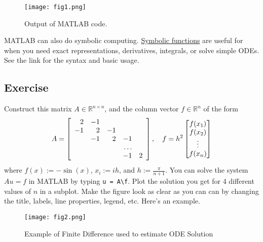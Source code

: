 \documentclass{article}
\begin{document}
\begin{figure}
\centering
\texttt{[image: fig1.png]}
\caption{Output of MATLAB code.}
\end{figure}

MATLAB can also do symbolic computing. \href{https://www.mathworks.com/help/symbolic/create-symbolic-functions.html}{Symbolic functions} are useful for when you need exact representations, derivatives, integrals, or solve simple ODEs. See the link for the syntax and basic usage.

\subsection{Exercise}
Construct this matrix $A\in \mathbb{R}^{n\times n}$, and the column vector $f\in \mathbb{R}^n$ of the form
$$ A =  \left[ \begin{array} { r r r r r } {2}&{-1}&{} \\ {-1}&{2}&{-1}&{} \\ {}&{-1}&{2}&{-1} \\ {}&{}&{}&{\dots} \\ {}&{}&{}&{-1}&{2} \end{array} \right],
\quad  f=  h^2\begin{bmatrix} f(x_1) \\ f(x_2) \\ \vdots \\ f(x_n) \end{bmatrix}$$
where $f(x) := -\sin(x)$, $x_i:=ih$, and $h := \frac{\pi}{n+1}$. You can solve the system $Au=f$ in MATLAB by typing \texttt{u = A\textbackslash f}. Plot the solution you get for 4 different values of $n$ in a subplot. Make the figure look as clear as you can can by changing the title, labels, line properties, legend, etc. Here's an example.

\begin{figure}
\centering
\texttt{[image: fig2.png]}
\caption{Example of Finite Difference used to estimate ODE Solution}
\end{figure}
\end{document}
